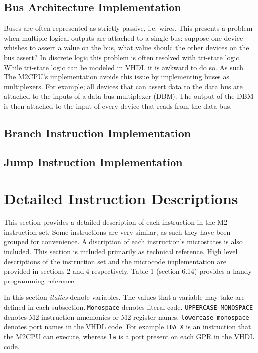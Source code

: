 \documentclass[a4paper,12pt]{article}
\newcommand{\mt}{M2CPU}
\newcommand{\mi}{M2 instruction set}
\begin{document}
\subsection{Bus Architecture Implementation}
Buses are often represented as strictly passive, i.e. wires. This presents a 
problem when multiple logical outputs are attached to a single bus: suppose one
device whishes to assert a value on the bus, what value should the other 
devices on the bus assert? In discrete logic this problem is often resolved with
tri-state logic. While tri-state logic can be modeled in VHDL it is awkward to 
do so. As such The \mt{}'s implementation avoids this issue by implementing 
buses as multiplexers. For example; all devices that can assert data to the data
bus are attached to the inputs of a data bus multiplexer (DBM). The output of 
the DBM is then attached to the input of every device that reads from the data 
bus.
\par

\subsection{Branch Instruction Implementation}

\subsection{Jump Instruction Implementation}

\newpage
\section{Detailed Instruction Descriptions}
This section provides a detailed description of each instruction in the \mi{}.
Some instructions are very similar, as such they have been grouped for 
convenience. A discription of each instruction's microstates is also included.
This section is included primarily as technical reference. High level 
descriptions of the instruction set and the microcode implementation are provided
in sections 2 and 4 respectively. Table 1 (section 6.14) provides a handy 
programming reference.
\par

In this section \textit{italics} denote variables. The values that a variable 
may take are defined in each subsection. \texttt{Monospace} denotes literal 
code. \texttt{UPPERCASE MONOSPACE} denotes M2 instruction mnemonics or M2 
register names. \texttt{lowercase monospace} denotes port names in the VHDL
code. For example \texttt{LDA X} is an instruction that the \mt{} can execute,
whereas \texttt{la} is a port present on each GPR in the VHDL code.
\par
\end{document}
